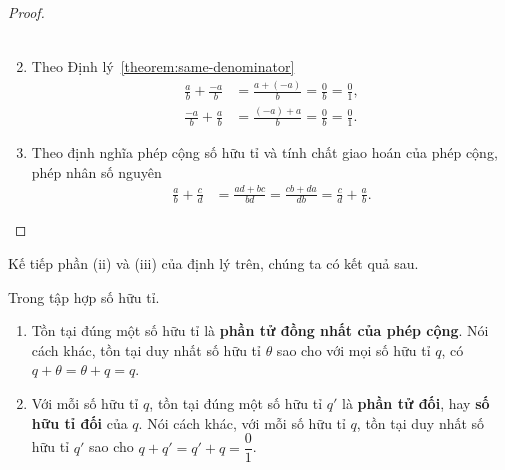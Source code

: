 \begin{proof}
\begin{enumerate}[label={(\roman*)}]
\begin{align*}
              \end{align*}
        \item Theo Định lý~\ref{theorem:same-denominator}
              \begin{align*}
                  \frac{a}{b} + \frac{-a}{b} & = \frac{a + (-a)}{b} = \frac{0}{b} = \frac{0}{1}, \\
                  \frac{-a}{b} + \frac{a}{b} & = \frac{(-a) + a}{b} = \frac{0}{b} = \frac{0}{1}.
              \end{align*}
        \item Theo định nghĩa phép cộng số hữu tỉ và tính chất giao hoán của phép cộng, phép nhân số nguyên
              \begin{align*}
                  \frac{a}{b} + \frac{c}{d} & = \frac{ad + bc}{bd} = \frac{cb + da}{db} = \frac{c}{d} + \frac{a}{b}.
              \end{align*}
    \end{enumerate}
\end{proof}

Kế tiếp phần (ii) và (iii) của định lý trên, chúng ta có kết quả sau.
\begin{theorem}\label{theorem:rational-numbers-additive-identity-and-additive-inverse}
    Trong tập hợp số hữu tỉ.
    \begin{enumerate}[label={(\roman*)}]
        \item Tồn tại đúng một số hữu tỉ là \textbf{phần tử đồng nhất của phép cộng}. Nói cách khác, tồn tại duy nhất số hữu tỉ $\theta$ sao cho với mọi số hữu tỉ $q$, có $q + \theta = \theta + q = q$.
        \item Với mỗi số hữu tỉ $q$, tồn tại đúng một số hữu tỉ $q'$ là \textbf{phần tử đối}, hay \textbf{số hữu tỉ đối} của $q$. Nói cách khác, với mỗi số hữu tỉ $q$, tồn tại duy nhất số hữu tỉ $q'$ sao cho $q + q' = q' + q = \dfrac{0}{1}$.
    \end{enumerate}
\end{theorem}

